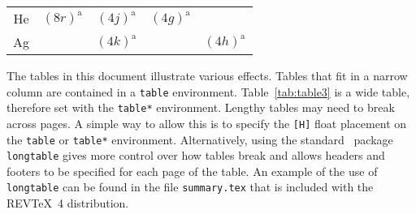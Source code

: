 \documentclass[%
 aapm,
 mph,%
 amsmath,amssymb,
preprint,%
 reprint,%
]{revtex4-2}
\begin{document}
\begin{table*}
\begin{ruledtabular}
\begin{tabular}{ccccc}
      He  & $(8r)^{\text{a}}$                                                            & $(4j)^{\text{a}}$                                                      & $(4g)^{\text{a}}$                     \\
      Ag  &                                                                              & $(4k)^{\text{a}}$                                                      &                   & $(4h)^{\text{a}}$ \\
    \end{tabular}
  \end{ruledtabular}
\end{table*}

The tables in this document illustrate various effects.
Tables that fit in a narrow column are contained in a \texttt{table}
environment.
Table~\ref{tab:table3} is a wide table, therefore set with the
\texttt{table*} environment.
Lengthy tables may need to break across pages.
A simple way to allow this is to specify
the \verb+[H]+ float placement on the \texttt{table} or
\texttt{table*} environment.
Alternatively, using the standard \LaTeXe\ package \texttt{longtable}
gives more control over how tables break and allows headers and footers
to be specified for each page of the table.
An example of the use of \texttt{longtable} can be found
in the file \texttt{summary.tex} that is included with the REV\TeX~4
distribution.
\end{document}
